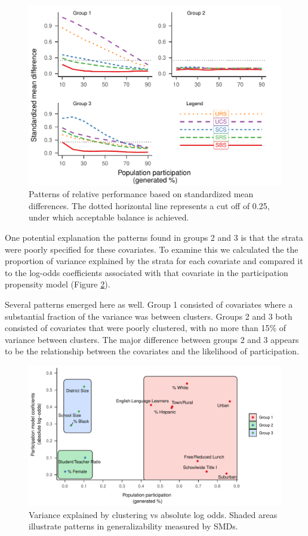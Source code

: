 \documentclass[english,man,floatsintext]{apa6}
\begin{document}
\begin{figure}
\centering
\includegraphics{6---Paper_files/figure-latex/fig-SMD-groups-1.pdf}
\caption{\label{fig:fig-SMD-groups}Patterns of relative performance based on standardized mean differences. The dotted horizontal line represents a cut off of 0.25, under which acceptable balance is achieved.}
\end{figure}

One potential explanation the patterns found in groups 2 and 3 is that the strata were poorly specified for these covariates. To examine this we calculated the the proportion of variance explained by the strata for each covariate and compared it to the log-odds coefficients associated with that covariate in the participation propensity model (Figure \ref{fig:fig-Var-Coef}).

Several patterns emerged here as well. Group 1 consisted of covariates where a substantial fraction of the variance was between clusters. Groups 2 and 3 both consisted of covariates that were poorly clustered, with no more than 15\% of variance between clusters. The major difference between groups 2 and 3 appears to be the relationship between the covariates and the likelihood of participation.



\begin{figure}
\centering
\includegraphics{6---Paper_files/figure-latex/fig-Var-Coef-1.pdf}
\caption{\label{fig:fig-Var-Coef}Variance explained by clustering vs absolute log odds. Shaded areas illustrate patterns in generalizability measured by SMDs.}
\end{figure}
\end{document}
